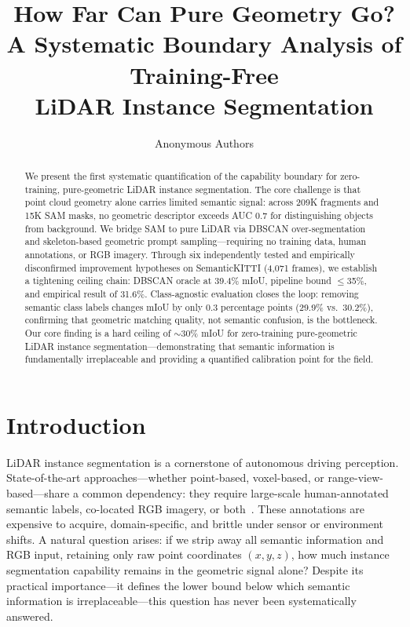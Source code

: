 \documentclass{article}
\title{How Far Can Pure Geometry Go? \\ A Systematic Boundary Analysis of Training-Free \\ LiDAR Instance Segmentation}
\author{Anonymous Authors}
\begin{document}
\maketitle

\begin{abstract}
We present the first systematic quantification of the capability boundary for
zero-training, pure-geometric LiDAR instance segmentation. The core challenge is that
point cloud geometry alone carries limited semantic signal: across 209K fragments and
15K SAM masks, no geometric descriptor exceeds AUC 0.7 for distinguishing objects from
background. We bridge SAM to pure LiDAR via DBSCAN over-segmentation and skeleton-based
geometric prompt sampling---requiring no training data, human annotations, or RGB
imagery. Through six independently tested and empirically disconfirmed improvement
hypotheses on SemanticKITTI (4,071 frames), we establish a tightening ceiling chain:
DBSCAN oracle at 39.4\% mIoU, pipeline bound $\leq$35\%, and empirical result of
31.6\%. Class-agnostic evaluation closes the loop: removing semantic class labels
changes mIoU by only 0.3 percentage points (29.9\% vs.\ 30.2\%), confirming
that geometric matching quality, not semantic confusion, is the bottleneck. Our core finding is a hard
ceiling of $\sim$30\% mIoU for zero-training pure-geometric LiDAR instance
segmentation---demonstrating that semantic information is fundamentally irreplaceable
and providing a quantified calibration point for the field.
\end{abstract}

\section{Introduction}

LiDAR instance segmentation is a cornerstone of autonomous driving perception.
State-of-the-art approaches---whether point-based, voxel-based, or
range-view-based---share a common dependency: they require large-scale
human-annotated semantic labels, co-located RGB imagery, or
both~\cite{dusi2025lidar}. These annotations are expensive to acquire,
domain-specific, and brittle under sensor or environment shifts. A natural
question arises: if we strip away all semantic information and RGB input,
retaining only raw point coordinates $(x, y, z)$, how much instance segmentation
capability remains in the geometric signal alone? Despite its practical
importance---it defines the lower bound below which semantic information is
irreplaceable---this question has never been systematically answered.
\end{document}
